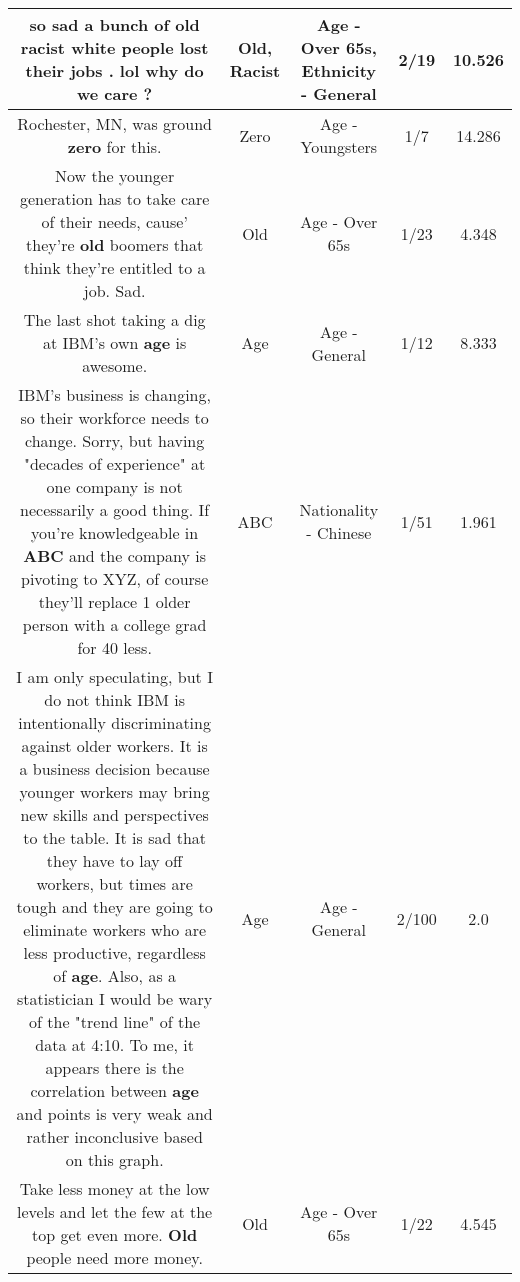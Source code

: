 \documentclass[11pt]{article}
\newlength\mylength
\begin{document}
\begin{center}
\begin{longtable}{|C{.65\mylength}|C{.30\mylength}|C{.12\mylength}|C{.12\mylength}|C{.12\mylength}|}
  \small so sad a bunch of \textbf{old} \textbf{racist} white people lost their jobs . lol why do we care ?\normalsize   & Old, Racist & Age - Over 65s, Ethnicity - General & 2/19 & 10.526 \\  \hline
  \small Rochester, MN, was ground \textbf{zero} for this.\normalsize   & Zero & Age - Youngsters & 1/7 & 14.286 \\  \hline
  \small Now the younger generation has to take care of their needs, cause' they're \textbf{old} boomers that think they're entitled to a job. Sad.\normalsize   & Old & Age - Over 65s & 1/23 & 4.348 \\  \hline
  \small The last shot taking a dig at IBM's own \textbf{age} is awesome.\normalsize   & Age & Age - General & 1/12 & 8.333 \\  \hline
  \small IBM's business is changing, so their workforce needs to change. Sorry, but having "decades of experience" at one company is not necessarily a good thing. If you're knowledgeable in \textbf{ABC} and the company is pivoting to XYZ, of course they'll replace 1 older person with a college grad for 40 less.\normalsize   & ABC & Nationality - Chinese & 1/51 & 1.961 \\  \hline
  \small I am only speculating, but I do not think IBM is intentionally discriminating against older workers. It is a business decision because younger workers may bring new skills and perspectives to the table. It is sad that they have to lay off workers, but times are tough and they are going to eliminate workers who are less productive, regardless of \textbf{age}. Also, as a statistician I would be wary of the "trend line" of the data at 4:10. To me, it appears there is the correlation between \textbf{age} and points is very weak and rather inconclusive based on this graph.\normalsize   & Age & Age - General & 2/100 & 2.0 \\  \hline
  \small Take less money at the low levels and let the few at the top get even more. \textbf{Old} people need more money.\normalsize   & Old & Age - Over 65s & 1/22 & 4.545 \\  \hline

\end{longtable}
\end{center}
\end{document}
